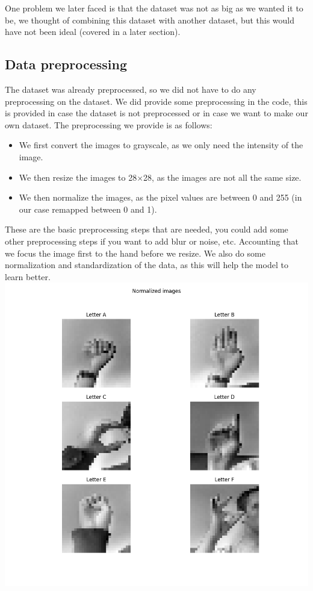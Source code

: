 \documentclass[../paper.tex]{subfiles}
\begin{document}
    One problem we later faced is that the dataset was not as big as we wanted it to be,
    we thought of combining this dataset with another dataset, but this would have not been ideal (covered in a later section).

    \subsection{Data preprocessing}
    The dataset was already preprocessed, so we did not have to do any preprocessing on the dataset. 
    We did provide some preprocessing in the code, this is provided in case the dataset is not preprocessed or in case we want to make our own dataset.
    The preprocessing we provide is as follows:
    \begin{itemize} 
        \item We first convert the images to grayscale, as we only need the intensity of the image.
        \item We then resize the images to 28$\times$28, as the images are not all the same size.
        \item We then normalize the images, as the pixel values are between 0 and 255 (in our case remapped between 0 and 1).
    \end{itemize} 
    These are the basic preprocessing steps that are needed, you could add some other preprocessing steps if you want to add blur or noise, etc.
    Accounting that we focus the image first to the hand before we resize.
    We also do some normalization and standardization of the data, as this will help the model to learn better. 
    \includegraphics[width=\linewidth]{letters_grid_normalized_6}
\end{document}
